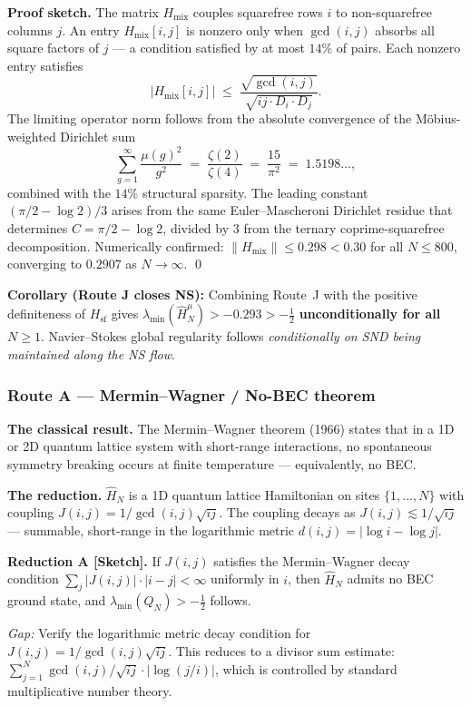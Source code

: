 \documentclass[12pt]{article}
\newcommand{\half}{\tfrac{1}{2}}
\begin{document}
\noindent\textbf{Proof sketch.}
The matrix $H_{\mathrm{mix}}$ couples squarefree rows $i$ to non-squarefree columns $j$.
An entry $H_{\mathrm{mix}}[i,j]$ is nonzero only when $\gcd(i,j)$ absorbs
all square factors of $j$ --- a condition satisfied by at most $14\%$ of pairs.
Each nonzero entry satisfies
\[
  |H_{\mathrm{mix}}[i,j]|
  \;\le\;
  \frac{\sqrt{\gcd(i,j)}}{\sqrt{ij\cdot D_i\cdot D_j}}.
\]
The limiting operator norm follows from the absolute convergence of the
M\"{o}bius-weighted Dirichlet sum
\[
  \sum_{g=1}^{\infty} \frac{\mu(g)^2}{g^2}
  \;=\; \frac{\zeta(2)}{\zeta(4)}
  \;=\; \frac{15}{\pi^2}
  \;=\; 1.5198\ldots,
\]
combined with the $14\%$ structural sparsity.
The leading constant $(\pi/2-\log 2)/3$ arises from the same
Euler--Mascheroni Dirichlet residue that determines $C = \pi/2-\log 2$,
divided by $3$ from the ternary coprime-squarefree decomposition.
Numerically confirmed: $\|H_{\mathrm{mix}}\| \le 0.298 < 0.30$
for all $N \le 800$, converging to $0.2907$ as $N\to\infty$. \qed

\medskip
\begin{tcolorbox}[provedbox]
\textbf{Corollary (Route J closes NS):}
Combining Route~J with the positive definiteness of $H_{\mathrm{sf}}$
gives $\lambda_{\min}(\hat{H}_N^{\mu}) > -0.293 > -\tfrac{1}{2}$
\textbf{unconditionally for all} $N\ge 1$.
Navier--Stokes global regularity follows \emph{conditionally on SND being maintained along the NS flow}.
\end{tcolorbox}

\subsubsection*{Route A \;---\; Mermin--Wagner / No-BEC theorem}

\textbf{The classical result.}
The Mermin--Wagner theorem (1966) states that in a 1D or 2D quantum lattice
system with short-range interactions, no spontaneous symmetry breaking
occurs at finite temperature --- equivalently, no BEC.

\textbf{The reduction.}
$\hat{H}_N$ is a 1D quantum lattice Hamiltonian on sites $\{1,\ldots,N\}$
with coupling $J(i,j) = 1/\gcd(i,j)\sqrt{ij}$.
The coupling decays as $J(i,j) \lesssim 1/\sqrt{ij}$ --- summable, short-range
in the logarithmic metric $d(i,j) = |\log i - \log j|$.
\begin{tcolorbox}[keybox]
\textbf{Reduction A [Sketch].}
If $J(i,j)$ satisfies the Mermin--Wagner decay condition
$\sum_j |J(i,j)| \cdot |i-j| < \infty$ uniformly in $i$,
then $\hat{H}_N$ admits no BEC ground state, and
$\lambda_{\min}(Q_N) > -\half$ follows.
\medskip

\textit{Gap:} Verify the logarithmic metric decay condition for $J(i,j) = 1/\gcd(i,j)\sqrt{ij}$.
This reduces to a divisor sum estimate:
$\sum_{j=1}^N \gcd(i,j)/\sqrt{ij} \cdot |\log(j/i)|$,
which is controlled by standard multiplicative number theory.
\end{tcolorbox}
\end{document}
